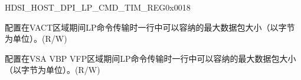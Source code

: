     \begin{register}{H}{DSI\_HOST\_DPI\_LP\_CMD\_TIM\_REG}{0x0018}\label{regdesc:DSIHOSTDPILPCMDTIMREG}
    \regnewline%
    \begin{regdesc}\begin{reglist}
    \label{fielddesc:DSIHOSTINVACTLPCMDTIME}\item [DSI\_HOST\_INVACT\_LPCMD\_TIME] 配置在VACT区域期间LP命令传输时一行中可以容纳的最大数据包大小（以字节为单位）。(R/W)
    \label{fielddesc:DSIHOSTOUTVACTLPCMDTIME}\item [DSI\_HOST\_OUTVACT\_LPCMD\_TIME] 配置在VSA VBP VFP区域期间LP命令传输时一行中可以容纳的最大数据包大小（以字节为单位）。(R/W)
    \end{reglist}\end{regdesc}
    \end{register}
    
    
    
    
    
    
    
    
    

